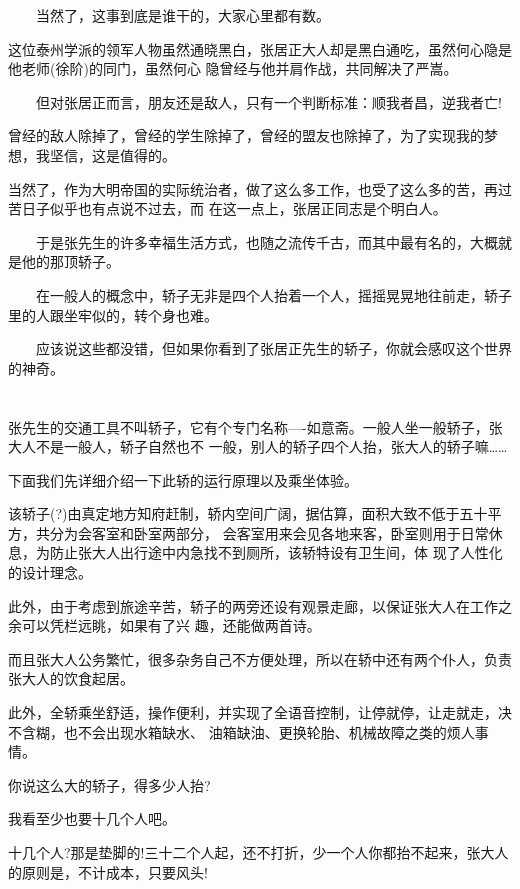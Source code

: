 \documentclass[11pt,a4paper,onecolumn]{article}
\begin{document}
　　当然了，这事到底是谁干的，大家心里都有数。

这位泰州学派的领军人物虽然通晓黑白，张居正大人却是黑白通吃，虽然何心隐是他老师(徐阶)的同门，虽然何心
隐曾经与他并肩作战，共同解决了严嵩。

　　但对张居正而言，朋友还是敌人，只有一个判断标准：顺我者昌，逆我者亡!

曾经的敌人除掉了，曾经的学生除掉了，曾经的盟友也除掉了，为了实现我的梦想，我坚信，这是值得的。

当然了，作为大明帝国的实际统治者，做了这么多工作，也受了这么多的苦，再过苦日子似乎也有点说不过去，而
在这一点上，张居正同志是个明白人。

　　于是张先生的许多幸福生活方式，也随之流传千古，而其中最有名的，大概就是他的那顶轿子。

　　在一般人的概念中，轿子无非是四个人抬着一个人，摇摇晃晃地往前走，轿子里的人跟坐牢似的，转个身也难。

　　应该说这些都没错，但如果你看到了张居正先生的轿子，你就会感叹这个世界的神奇。

\section[\thesection]{}

张先生的交通工具不叫轿子，它有个专门名称----如意斋。一般人坐一般轿子，张大人不是一般人，轿子自然也不
一般，别人的轿子四个人抬，张大人的轿子嘛……

下面我们先详细介绍一下此轿的运行原理以及乘坐体验。

该轿子(?)由真定地方知府赶制，轿内空间广阔，据估算，面积大致不低于五十平方，共分为会客室和卧室两部分，
会客室用来会见各地来客，卧室则用于日常休息，为防止张大人出行途中内急找不到厕所，该轿特设有卫生间，体
现了人性化的设计理念。

此外，由于考虑到旅途辛苦，轿子的两旁还设有观景走廊，以保证张大人在工作之余可以凭栏远眺，如果有了兴
趣，还能做两首诗。

而且张大人公务繁忙，很多杂务自己不方便处理，所以在轿中还有两个仆人，负责张大人的饮食起居。

此外，全轿乘坐舒适，操作便利，并实现了全语音控制，让停就停，让走就走，决不含糊，也不会出现水箱缺水、
油箱缺油、更换轮胎、机械故障之类的烦人事情。

你说这么大的轿子，得多少人抬?

我看至少也要十几个人吧。

十几个人?那是垫脚的!三十二个人起，还不打折，少一个人你都抬不起来，张大人的原则是，不计成本，只要风头!
\end{document}
